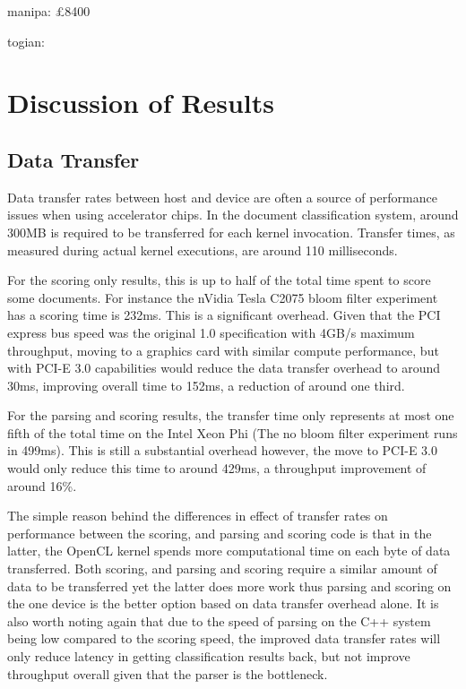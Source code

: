 manipa: £8400

togian:

\section{Discussion of Results}

\subsection{Data Transfer}

Data transfer rates between host and device are often a source of performance
issues when using accelerator chips. In the document classification system,
around 300MB is required to be transferred for each kernel invocation. Transfer
times, as measured during actual kernel executions, are around 110 milliseconds.

For the scoring only results, this is up to half of the total time spent to
score some documents. For instance the nVidia Tesla C2075 bloom filter
experiment has a scoring time is 232ms. This is a significant overhead. Given
that the PCI express bus speed was the original 1.0 specification with 4GB/s
maximum throughput, moving to a graphics card with similar compute performance,
but with PCI-E 3.0 capabilities would reduce the data transfer overhead to
around 30ms, improving overall time to 152ms, a reduction of around one third.

For the parsing and scoring results, the transfer time only represents at most
one fifth of the total time on the Intel Xeon Phi (The no bloom filter
experiment runs in 499ms). This is still a substantial overhead however, the
move to PCI-E 3.0 would only reduce this time to around 429ms, a throughput
improvement of around 16\%.

The simple reason behind the differences in effect of transfer rates on
performance between the scoring, and parsing and scoring code is that in the
latter, the OpenCL kernel spends more computational time on each byte of data
transferred. Both scoring, and parsing and scoring require a similar amount of
data to be transferred yet the latter does more work thus parsing and scoring on
the one device is the better option based on data transfer overhead alone. It is
also worth noting again that due to the speed of parsing on the C++ system being
low compared to the scoring speed, the improved data transfer rates will only
reduce latency in getting classification results back, but not improve
throughput overall given that the parser is the bottleneck.

